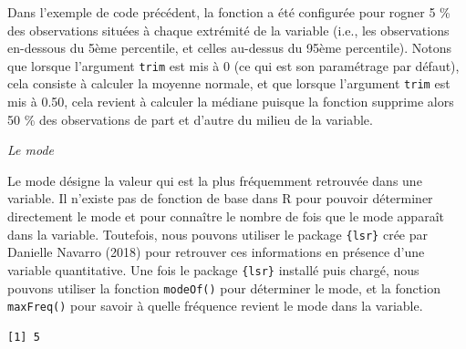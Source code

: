 \documentclass[
  letterpaper,
]{book}
\newenvironment{Shaded}{\begin{snugshade}}{\end{snugshade}}
\newcommand{\AttributeTok}[1]{\textcolor[rgb]{0.40,0.45,0.13}{#1}}
\newcommand{\CommentTok}[1]{\textcolor[rgb]{0.37,0.37,0.37}{#1}}
\newcommand{\FloatTok}[1]{\textcolor[rgb]{0.68,0.00,0.00}{#1}}
\newcommand{\FunctionTok}[1]{\textcolor[rgb]{0.28,0.35,0.67}{#1}}
\newcommand{\NormalTok}[1]{\textcolor[rgb]{0.00,0.23,0.31}{#1}}
\newcommand{\SpecialCharTok}[1]{\textcolor[rgb]{0.37,0.37,0.37}{#1}}
\begin{document}
\begin{Shaded}
\end{Shaded}

Dans l'exemple de code précédent, la fonction a été configurée pour
rogner 5 \% des observations situées à chaque extrémité de la variable
(i.e., les observations en-dessous du 5ème percentile, et celles
au-dessus du 95ème percentile). Notons que lorsque l'argument
\texttt{trim} est mis à 0 (ce qui est son paramétrage par défaut), cela
consiste à calculer la moyenne normale, et que lorsque l'argument
\texttt{trim} est mis à 0.50, cela revient à calculer la médiane puisque
la fonction supprime alors 50 \% des observations de part et d'autre du
milieu de la variable.

\emph{Le mode}

Le mode désigne la valeur qui est la plus fréquemment retrouvée dans une
variable. Il n'existe pas de fonction de base dans R pour pouvoir
déterminer directement le mode et pour connaître le nombre de fois que
le mode apparaît dans la variable. Toutefois, nous pouvons utiliser le
package \texttt{\{lsr\}} crée par Danielle Navarro (2018) pour retrouver
ces informations en présence d'une variable quantitative. Une fois le
package \texttt{\{lsr\}} installé puis chargé, nous pouvons utiliser la
fonction \texttt{modeOf()} pour déterminer le mode, et la fonction
\texttt{maxFreq()} pour savoir à quelle fréquence revient le mode dans
la variable.

\begin{Shaded}
\end{Shaded}

\begin{verbatim}
[1] 5
\end{verbatim}

\begin{Shaded}
\end{Shaded}
\end{document}
